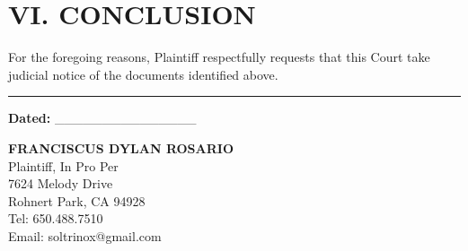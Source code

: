 \section{VI. CONCLUSION}\label{vi.-conclusion}

For the foregoing reasons, Plaintiff respectfully requests that this Court take judicial notice of the documents identified above.

\begin{center}\rule{0.5\linewidth}{0.5pt}\end{center}

\textbf{Dated:} \_\_\_\_\_\_\_\_\_\_\_\_\_\_\_

\textbf{FRANCISCUS DYLAN ROSARIO}\\
Plaintiff, In Pro Per\\
7624 Melody Drive\\
Rohnert Park, CA 94928\\
Tel: 650.488.7510\\
Email: soltrinox@gmail.com

\nolinenumbers



